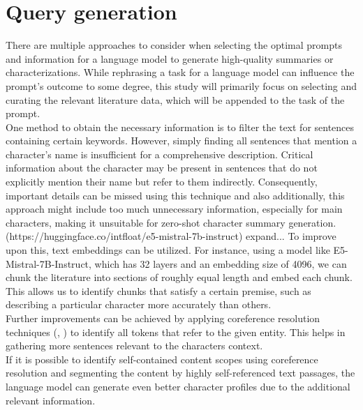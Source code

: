 \section{Query generation}
There are multiple approaches to consider when selecting the optimal prompts and information for a language model to generate high-quality summaries or characterizations. While rephrasing a task for a language model can influence the prompt's outcome to some degree, this study will primarily focus on selecting and curating the relevant literature data, which will be appended to the task of the prompt.\\

One method to obtain the necessary information is to filter the text for sentences containing certain keywords. However, simply finding all sentences that mention a character's name is insufficient for a comprehensive description. Critical information about the character may be present in sentences that do not explicitly mention their name but refer to them indirectly. Consequently, important details can be missed using this technique and also additionally, this approach might include too much unnecessary information, especially for main characters, making it unsuitable for zero-shot character summary generation.\\

(https://huggingface.co/intfloat/e5-mistral-7b-instruct) expand...
To improve upon this, text embeddings can be utilized. For instance, using a model like E5-Mistral-7B-Instruct, which has 32 layers and an embedding size of 4096, we can chunk the literature into sections of roughly equal length and embed each chunk. This allows us to identify chunks that satisfy a certain premise, such as describing a particular character more accurately than others.\\

Further improvements can be achieved by applying coreference resolution techniques (\cite{schroder-etal-2021-neural}, \cite{dobrovolskii-2021-word}) to identify all tokens that refer to the given entity. This helps in gathering more sentences relevant to the characters context.\\

If it is possible to identify self-contained content scopes using coreference resolution and segmenting the content by highly self-referenced text passages, the language model can generate even better character profiles due to the additional relevant information.\\



